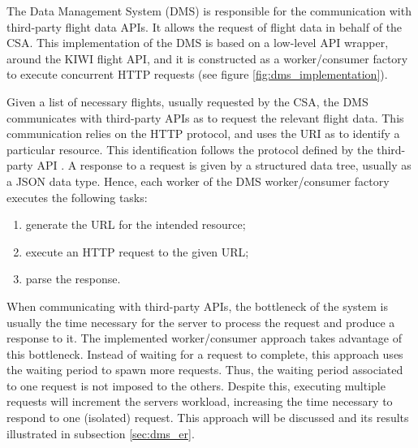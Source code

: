 The Data Management System (DMS) is responsible for the communication with third-party flight data APIs. It allows the request of flight data in behalf of the CSA. This implementation of the DMS is based on a low-level API wrapper, around the KIWI flight API, and it is constructed as a worker/consumer factory to execute concurrent HTTP requests (see figure \ref{fig:dms_implementation}). 


Given a list of necessary flights, usually requested by the CSA, the DMS communicates with third-party APIs as to request the relevant flight data. This communication relies on the HTTP protocol, and uses the URI as to identify a particular resource. This identification follows the protocol defined by the third-party API \cite{kiwi_api}. A response to a request is given by a structured data tree, usually as a JSON data type. Hence, each worker of the DMS worker/consumer factory executes the following tasks:
\begin{enumerate}
  \item generate the URL for the intended resource;
  \item execute an HTTP request to the given URL;
  \item parse the response.
\end{enumerate}

When communicating with third-party APIs, the bottleneck of the system is usually the time necessary for the server to process the request and produce a response to it. The implemented worker/consumer approach takes advantage of this bottleneck. Instead of waiting for a request to complete, this approach uses the waiting period to spawn more requests. Thus, the waiting period associated to one request is not imposed to the others. Despite this, executing multiple requests will increment the servers workload, increasing the time necessary to respond to one (isolated) request. This approach will be discussed and its results illustrated in subsection \ref{sec:dms_er}. 


